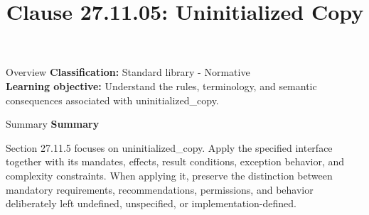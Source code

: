 \documentclass[10pt,letterpaper]{article}
\title{Clause 27.11.05: Uninitialized Copy}
\author{}
\date{}
\begin{document}
\maketitle
\begin{CornellOverviewBox}{Overview}
\textbf{Classification:} Standard library - Normative\\[2pt]
\textbf{Learning objective:} Understand the rules, terminology, and semantic consequences associated with uninitialized\_copy.
\end{CornellOverviewBox}\begin{CornellSummaryBox}{Summary}
{\sffamily\bfseries\color{Accent} Summary}\par\vspace{3pt}Section 27.11.5 focuses on uninitialized\_copy. Apply the specified interface together with its mandates, effects, result conditions, exception behavior, and complexity constraints. When applying it, preserve the distinction between mandatory requirements, recommendations, permissions, and behavior deliberately left undefined, unspecified, or implementation-defined.
\end{CornellSummaryBox}
\end{document}
